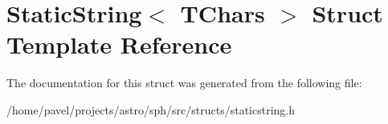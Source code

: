 \hypertarget{structStaticString}{}\section{Static\+String$<$ T\+Chars $>$ Struct Template Reference}
\label{structStaticString}


The documentation for this struct was generated from the following file\+:\begin{DoxyCompactItemize}
\item 
/home/pavel/projects/astro/sph/src/structs/staticstring.\+h\end{DoxyCompactItemize}

